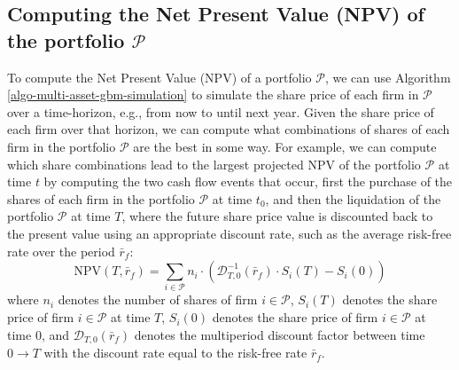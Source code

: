 \documentclass[11pt]{article}
\theoremstyle{definition}
\begin{document}
\subsection*{Computing the Net Present Value (NPV) of the portfolio $\mathcal{P}$}
To compute the Net Present Value (NPV) of a portfolio $\mathcal{P}$, we can use Algorithm \ref{algo-multi-asset-gbm-simulation} to simulate the share price of each firm in $\mathcal{P}$ over a time-horizon, e.g., from now to until next year.
Given the share price of each firm over that horizon, we can compute what combinations of shares of each firm in the portfolio $\mathcal{P}$ are the best in some way. For example, we can compute which share combinations lead to the largest projected NPV of the portfolio $\mathcal{P}$ at time $t$ by computing the 
two cash flow events that occur, first the purchase of the shares of each firm in the portfolio $\mathcal{P}$ at time $t_{0}$, and then the liquidation of the portfolio $\mathcal{P}$ at time $T$, where the future share price value is discounted back to the present value using an appropriate discount rate, such as the average risk-free rate over the period $\bar{r}_{f}$:
\begin{equation}\label{eqn:npv-mv-gbm}
\text{NPV}(T,\bar{r}_{f}) = \sum_{i\in\mathcal{P}}n_{i}\cdot\left(\mathcal{D}_{T,0}^{-1}(\bar{r}_{f})\cdot{S_{i}(T)}-S_{i}(0)\right)
\end{equation}
where $n_{i}$ denotes the number of shares of firm $i\in\mathcal{P}$, $S_{i}(T)$ denotes the share price of firm $i\in\mathcal{P}$ at time $T$, $S_{i}(0)$ denotes the share price of firm $i\in\mathcal{P}$ at time $0$, and $\mathcal{D}_{T,0}(\bar{r}_{f})$ denotes the multiperiod discount factor between time $0\rightarrow{T}$ with the discount rate equal to the risk-free rate $\bar{r}_{f}$.
\end{document}
